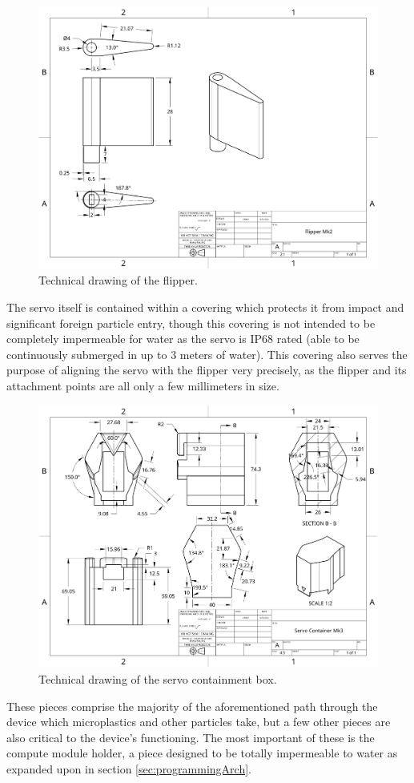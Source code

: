 \documentclass[fleqn,10pt]{SelfArx} %
\begin{document}
		\begin{figure}[h]
			\centering
			\includegraphics[width=1\linewidth]{Figures/TechFlipper}
			\caption[Flipper Tech. Drawing]{Technical drawing of the flipper.}
			\label{fig:techFlipper}
		\end{figure} 
		The servo itself is contained within a covering which protects it from impact and significant foreign particle entry, though this covering is not intended to be completely impermeable for water as the servo is IP68 rated (able to be continuously submerged in up to 3 meters of water). This covering also serves the purpose of aligning the servo with the flipper very precisely, as the flipper and its attachment points are all only a few millimeters in size. 
		\begin{figure}[h]
			\centering
			\includegraphics[width=1\linewidth]{Figures/TechServoBox}
			\caption[Servo Container Tech. Drawing]{Technical drawing of the servo containment box.}
			\label{fig:techServo}
		\end{figure} 
		These pieces comprise the majority of the aforementioned path through the device which microplastics and other particles take, but a few other pieces are also critical to the device’s functioning. The most important of these is the compute module holder, a piece designed to be totally impermeable to water as expanded upon in section \ref{sec:programmingArch}. 
		
\end{document}
